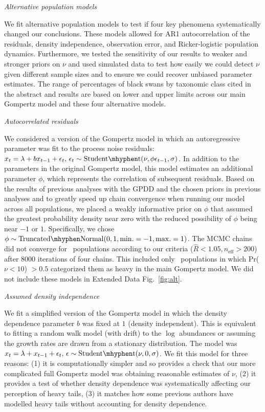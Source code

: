 \emph{Alternative population models}

We fit alternative population models to test if four key phenomena systematically changed our conclusions. These models allowed for AR1 autocorrelation of the residuals, density independence, observation error, and Ricker-logistic population dynamics. Furthermore, we tested the sensitivity of our results to weaker and stronger priors on \(\nu\) and used simulated data to test how easily we could detect \(\nu\) given different sample sizes and to ensure we could recover unbiased parameter estimates. The range of percentages of black swans by taxonomic class cited in the abstract and results are based on lower and upper limits across our main Gompertz model and these four alternative models.

\emph{Autocorrelated residuals}

We considered a version of the Gompertz model in which an autoregressive parameter was fit to the process noise residuals: \(x_t = \lambda + b x_{t-1} + \epsilon_t,\, \epsilon_t \sim \mathrm{Student\mhyphen t}(\nu, \phi \epsilon_{t-1}, \sigma)\). In addition to the parameters in the original Gompertz model, this model estimates an additional parameter \(\phi\), which represents the correlation of subsequent residuals. Based on the results of previous analyses with the GPDD\cite{connors2014} and the chosen priors in previous analyses\cite{thorson2014a} and to greatly speed up chain convergence when running our model across all populations, we placed a weakly informative prior on \(\phi\) that assumed the greatest probability density near zero with the reduced possibility of \(\phi\) being near \(-1\) or \(1\). Specifically, we chose \(\phi \sim \mathrm{Truncated\mhyphen Normal}(0, 1, \mathrm{min.} = -1, \mathrm{max.} = 1)\). The MCMC chains did not converge for \modelsNoConvergeAROne\ populations according to our criteria (\(\widehat{R} < 1.05, n_\mathrm{eff} > 200\)) after 8000 iterations of four chains. This included only \modelsNoConvergeAROneHeavyBase\ populations in which Pr(\(\nu < 10\)) \(> 0.5\) categorized them as heavy in the main Gompertz model. We did not include these models in Extended Data Fig.~\ref{fig:alt}.

\emph{Assumed density independence}

We fit a simplified version of the Gompertz model in which the density dependence parameter \(b\) was fixed at \(1\) (density independent). This is equivalent to fitting a random walk model (with drift) to the \(\log\) abundances or assuming the growth rates are drawn from a stationary distribution. The model was \(x_t = \lambda + x_{t-1} + \epsilon_t,\, \epsilon \sim \mathrm{Student\mhyphen t}(\nu, 0, \sigma)\). We fit this model for three reasons: (1) it is computationally simpler and so provides a check that our more complicated full Gompertz model was obtaining reasonable estimates of \(\nu\), (2) it provides a test of whether density dependence was systematically affecting our perception of heavy tails, (3) it matches how some previous authors have modelled heavy tails without accounting for density dependence\cite{segura2013}.


